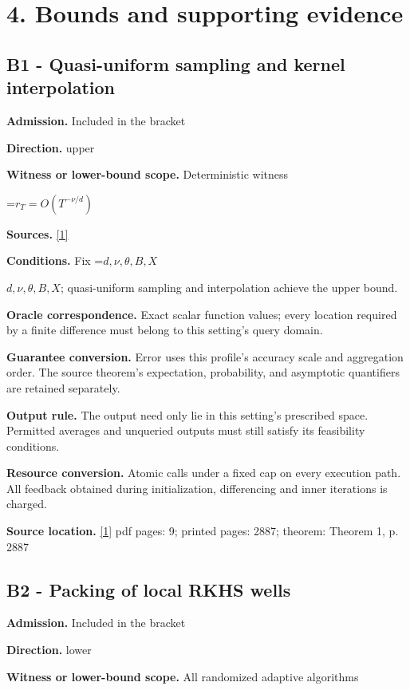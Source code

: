 \documentclass[10pt,a4paper]{article}
\newcommand{\AtlasMath}[1]{\par\begingroup\centering\setbox0=\hbox{$\displaystyle #1$}\ifdim\wd0>1.4\linewidth\typeout{ATLAS WIDE FORMULA: \the\wd0}\fi\ifdim\wd0>\linewidth\resizebox{\linewidth}{!}{\box0}\else\box0\fi\par\endgroup}
\newcommand{\AtlasInlineMath}[1]{\begingroup\setbox0=\hbox{$#1$}\ifdim\wd0>.4\linewidth\endgroup\AtlasMath{#1}\else\endgroup$#1$\fi}
\begin{document}
\section{4. Bounds and supporting evidence}
\subsection{B1 - Quasi-uniform sampling and kernel interpolation}
\textbf{Admission.} Included in the bracket

\textbf{Direction.} upper

\textbf{Witness or lower-bound scope.} Deterministic witness

\AtlasMath{r_T=O(T^{-\nu/d})}
\textbf{Sources.} \href{https://www.jmlr.org/papers/volume12/bull11a/bull11a.pdf}{[1]}

\textbf{Conditions.} Fix \AtlasInlineMath{d,\nu,\theta,B,X}; quasi-uniform sampling and interpolation achieve the upper bound.

\textbf{Oracle correspondence.} Exact scalar function values; every location required by a finite difference must belong to this setting's query domain.

\textbf{Guarantee conversion.} Error uses this profile's accuracy scale and aggregation order. The source theorem's expectation, probability, and asymptotic quantifiers are retained separately.

\textbf{Output rule.} The output need only lie in this setting's prescribed space. Permitted averages and unqueried outputs must still satisfy its feasibility conditions.

\textbf{Resource conversion.} Atomic calls under a fixed cap on every execution path. All feedback obtained during initialization, differencing and inner iterations is charged.

\textbf{Source location.} \href{https://www.jmlr.org/papers/volume12/bull11a/bull11a.pdf}{[1]} pdf pages: 9; printed pages: 2887; theorem: Theorem 1, p. 2887

\subsection{B2 - Packing of local RKHS wells}
\textbf{Admission.} Included in the bracket

\textbf{Direction.} lower

\textbf{Witness or lower-bound scope.} All randomized adaptive algorithms
\end{document}
